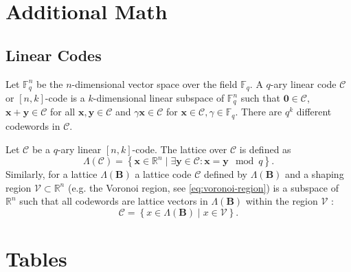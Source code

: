\chapter{Additional Math}
\section{Linear Codes} \label{sec:linear-code} %
Let $\mathbb{F}_q^n$ be the $n$-dimensional vector space over the field $\mathbb{F}_q$. A $q$-ary linear code $\mathcal{C}$ or $[n, k]$-code \cite{VanLint12} is a $k$-dimensional linear subspace of $\mathbb{F}_q^n$ such that $\mathbf{0} \in \mathcal{C}$, $\mathbf{x} + \mathbf{y} \in \mathcal{C}$ for all $\mathbf{x}, \mathbf{y} \in \mathcal{C}$ and $\gamma \mathbf{x} \in \mathcal{C}$ for $\mathbf{x} \in \mathcal{C}, \gamma \in \mathbb{F}_q$. There are $q^k$ different codewords in $\mathcal{C}$.

Let $\mathcal{C}$ be a $q$-ary linear $[n, k]$-code. The lattice over $\mathcal{C}$ \cite{GJS15} is defined as
\begin{equation}
    \Lambda(\mathcal{C}) = \left\{ \mathbf{x} \in \mathbb{R}^n \mid \exists \mathbf{y} \in \mathcal{C} : \mathbf{x} = \mathbf{y} \mod q  \right\}.
\end{equation} %
Similarly, for a lattice $\Lambda(\mathbf{B})$ a lattice code $\mathcal{C}$ defined by $\Lambda(\mathbf{B})$ and a shaping region $\mathcal{V} \subset \mathbb{R}^n$ (e.g. the Voronoi region, see \cref{eq:voronoi-region}) is a subspace of $\mathbb{R}^n$ such that all codewords are lattice vectors in $\Lambda(\mathbf{B})$ within the region $\mathcal{V}$ \cite{SFS08}:
\begin{equation}
    \mathcal{C} = \left\{ x \in \Lambda(\mathbf{B}) \mid x \in \mathcal{V} \right\}.
\end{equation} %

\chapter{Tables}
